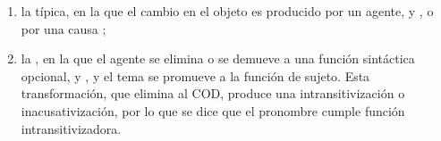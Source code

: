 \begin{enumerate}[label=\alph*)]
  \item la  típica, en la que el
        cambio en el objeto es producido por un agente,  y
        , o por una causa ;
  \item la , en la que el agente se
        elimina  o se demueve a una función sintáctica
        opcional,  y , y el tema se
        promueve a la función de sujeto. Esta transformación, que elimina al COD,
        produce una intransitivización o inacusativización, por lo que se dice
        que el pronombre cumple función intransitivizadora.
\end{enumerate}

